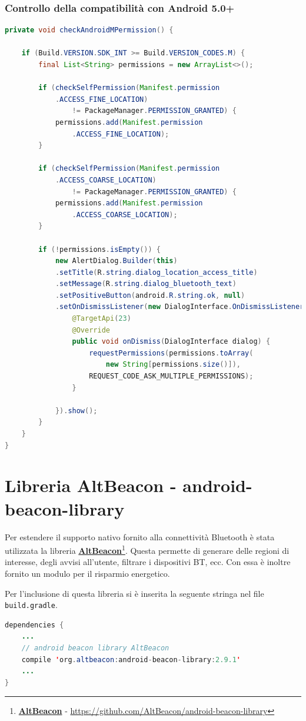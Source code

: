\subsubsection{Controllo della compatibilità con Android 5.0+}
\begin{lstlisting}[language=Java]
private void checkAndroidMPermission() {
   	
   	if (Build.VERSION.SDK_INT >= Build.VERSION_CODES.M) {
   		final List<String> permissions = new ArrayList<>();
   		
   		if (checkSelfPermission(Manifest.permission
		   	.ACCESS_FINE_LOCATION)
		   		!= PackageManager.PERMISSION_GRANTED) {
   			permissions.add(Manifest.permission
	   			.ACCESS_FINE_LOCATION);
   		}
   		
   		if (checkSelfPermission(Manifest.permission
	   		.ACCESS_COARSE_LOCATION)
		   		!= PackageManager.PERMISSION_GRANTED) {
   			permissions.add(Manifest.permission
	   			.ACCESS_COARSE_LOCATION);
   		}
   		
   		if (!permissions.isEmpty()) {
   			new AlertDialog.Builder(this)
   			.setTitle(R.string.dialog_location_access_title)
   			.setMessage(R.string.dialog_bluetooth_text)
   			.setPositiveButton(android.R.string.ok, null)
   			.setOnDismissListener(new DialogInterface.OnDismissListener() {
   				@TargetApi(23)
   				@Override
   				public void onDismiss(DialogInterface dialog) {
   					requestPermissions(permissions.toArray(
	   					new String[permissions.size()]),
   					REQUEST_CODE_ASK_MULTIPLE_PERMISSIONS);
   				}
   				
   			}).show();
   		}
   	}
}
\end{lstlisting}

\section{Libreria AltBeacon - android-beacon-library}
Per estendere il supporto nativo fornito alla connettività Bluetooth è stata utilizzata la libreria \href{https://github.com/AltBeacon/android-beacon-library}{\textbf{AltBeacon}}\footnote{\href{https://github.com/AltBeacon/android-beacon-library}{\textbf{AltBeacon}} - \url{https://github.com/AltBeacon/android-beacon-library}}. Questa permette di generare delle regioni di interesse, degli avvisi all'utente, filtrare i dispositivi BT, ecc. Con essa è inoltre fornito un modulo per il risparmio energetico.

Per l'inclusione di questa libreria si è inserita la seguente stringa nel file \texttt{build.gradle}.
\begin{lstlisting}[language=Java]
dependencies {
	...
	// android beacon library AltBeacon
	compile 'org.altbeacon:android-beacon-library:2.9.1'
	...
}
\end{lstlisting}

